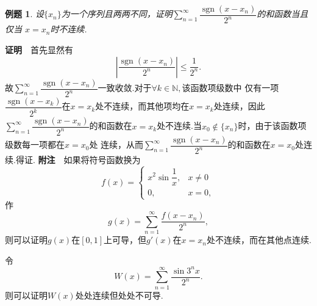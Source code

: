 \documentclass[UTF8]{article}
\DeclareMathOperator{\sgn}{sgn}
\newcommand{\zm}{\textbf{证明}$\quad$}
\newcommand{\fz}{\textbf{附注}$\quad$}
\newtheorem{exa}{\hspace{2em}例题}[section]
\begin{document}
  \begin{exa}
    设$\{x_n\}$为一个序列且两两不同，证明$\sum\limits_{n=1}^\infty\dfrac{\sgn(x-x_n)}{2^n}$的和函数当且仅当
    $x=x_n$时不连续.
  \end{exa}
  \zm 首先显然有
  $$\left|\dfrac{\sgn(x-x_n)}{2^n}\right|\le\frac{1}{2^n}.$$
  故$\sum\limits_{n=1}^\infty\dfrac{\sgn(x-x_n)}{2^n}$一致收敛.对于$\forall k\in\mathbb{N},$该函数项级数中
  仅有一项$\dfrac{\sgn(x-x_k)}{2^k}$在$x=x_k$处不连续，而其他项均在$x=x_k$处连续，因此$\sum\limits_{n=1}^\infty
  \dfrac{\sgn(x-x_n)}{2^n}$的和函数在$x=x_k$处不连续.当$x_0\notin\{x_n\}$时，由于该函数项级数每一项都在$x=x_0$处
  连续，从而$\sum\limits_{n=1}^\infty\dfrac{\sgn(x-x_n)}{2^n}$的和函数在$x=x_0$处连续.得证.
  \fz 如果将符号函数换为
  $$f(x)=\begin{cases} x^2\sin\dfrac{1}{x},& x\ne0\\ 0,& x=0,\end{cases}$$
  作
  $$g(x)=\sum_{n=1}^\infty\frac{f(x-x_n)}{2^n},$$
  则可以证明$g(x)$在$[0,1]$上可导，但$g'(x)$在$x=x_n$处不连续，而在其他点连续.

  令
  $$W(x)=\sum_{n=1}^\infty\frac{\sin 3^nx}{2^n}.$$
  则可以证明$W(x)$处处连续但处处不可导.
\end{document}
